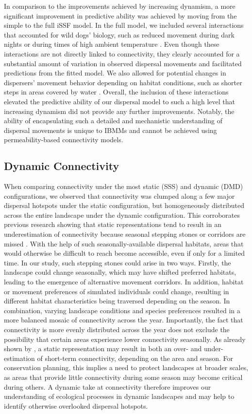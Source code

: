 \documentclass[abstract=on,10pt,a4paper,bibliography=totocnumbered]{article}
\begin{document}
In comparison to the improvements achieved by increasing dynamism, a more
significant improvement in predictive ability was achieved by moving from the
simple to the full iSSF model. In the full model, we included several
interactions that accounted for wild dogs' biology, such as reduced movement
during dark nights \citep{Cozzi.2013} or during times of high ambient
temperature \citep{Rabaiotti.2021}. Even though these interactions are not
directly linked to connectivity, they clearly accounted for a substantial amount
of variation in observed dispersal movements and facilitated predictions from
the fitted model. We also allowed for potential changes in dispersers' movement
behavior depending on habitat conditions, such as shorter steps in areas covered
by water \citep{Hofmann.2023}. Overall, the inclusion of these interactions
elevated the predictive ability of our dispersal model to such a high level that
increasing dynamism did not provide any further improvements. Notably, the
ability of encapsulating such a detailed and mechanistic understanding of
dispersal movements is unique to IBMMs and cannot be achieved using
permeability-based connectivity models.

\subsection{Dynamic Connectivity}

When comparing connectivity under the most static (SSS) and dynamic (DMD)
configurations, we observed that connectivity was clumped along a few major
dispersal hotspots under the static configuration, but homogeneously distributed
across the entire landscape under the dynamic configuration. This corroborates
previous research showing that static representations tend to result in an
underestimation of connectivity because seasonal stepping stones or corridors
are missed \citep{Martensen.2017}. With the help of such seasonally-available
dispersal habitats, areas that would otherwise be difficult to reach become
accessible, even if only for a limited time. In our study, such stepping stones
could arise in two ways. Firstly, the landscape could change seasonally, which
may have shifted preferred habitats, leading to the emergence of alternative
movement corridors. In addition, habitat or movement preferences of simulated
individuals could change, resulting in different habitat characteristics being
traversed depending on the season. In combination, varying landscape conditions
and species preferences resulted in a more balanced mosaic of connectivity
across the year. Importantly, the fact that connectivity is more evenly
distributed across the year does not exclude the possibility that certain areas
experience lower connectivity seasonally. As already shown by
\citet{Osipova.2019}, a static representation may result in both an over- and
under-estimation of short-term connectivity, depending on the area and season.
For conservation planning, this implies a need to protect landscapes at broader
scales, as areas that provide little connectivity during some season may become
critical during others. A dynamic take at connectivity therefore improves our
understanding of ecological processes in dynamic landscapes and may help to
identify otherwise overlooked dispersal hotspots.
\end{document}
